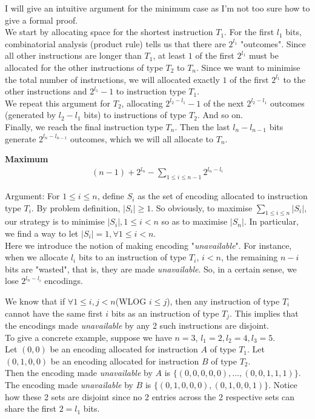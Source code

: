 \documentclass{article}
\begin{document}
I will give an intuitive argument for the minimum case as I'm not too sure how to give a formal proof.\\
We start by allocating space for the shortest instruction $T_1$. For the first $l_1$ bits, combinatorial analysis (product rule) tells us that there are $2^{l_1}$ "outcomes". Since all other instructions are longer than $T_1$, at least $1$ of the first $2^{l_1}$ must be allocated for the other instructions of type $T_2$ to $T_n$. Since we want to minimise the total number of instructions, we will allocated exactly $1$ of the first $2^{l_1}$ to the other instructions and $2^{l_1}-1$ to instruction type $T_1$.\\
We repeat this argument for $T_2$, allocating $2^{l_2-l_1}-1$ of the next $2^{l_2-l_1}$ outcomes (generated by $l_2-l_1$ bits) to instructions of type $T_2$. And so on.\\
Finally, we reach the final instruction type $T_n$. Then the last $l_n-l_{n-1}$ bits generate  $2^{l_n-l_{n-1}}$ outcomes, which we will all allocate to $T_n$.

\textbf{Maximum}
\begin{align*}
	(n-1) + 2^{l_n} - \sum_{1\leq i\leq n-1}2^{l_n-l_i}
\end{align*}

Argument: For $1\leq i\leq n$, define $S_i$ as the set of encoding allocated to instruction type $T_i$. By problem definition, $|S_i|\geq 1$. So obviously, to maximise $\sum_{1\leq i\leq n} |S_i|$, our strategy is to minimise $|S_i|, 1\leq i<n$ so as to maximise $|S_n|$. In particular, we find a way to let $|S_i|=1, \forall 1\leq i<n$.\\
Here we introduce the notion of making encoding "\textit{unavailable}". For instance, when we allocate $l_i$ bits to an instruction of type $T_i$, $i<n$, the remaining $n-i$ bits are "wasted", that is, they are made \textit{unavailable}. So, in a certain sense, we lose $2^{l_n-l_i}$ encodings.

We know that if $\forall 1\leq i,j<n$(WLOG $i\leq j$), then any instruction of type $T_i$ cannot have the same first $i$ bits as an instruction of type $T_j$. This implies that the encodings made \textit{unavailable} by any 2 such instructions are disjoint.\\
To give a concrete example, suppose we have $n=3$, $l_1=2,l_2=4,l_3=5$. \\
Let $(0,0)$ be an encoding allocated for instruction $A$ of type $T_1$. Let $(0,1,0,0)$ be an encoding allocated for instruction $B$ of type $T_2$.\\
Then the encoding made \textit{unavailable} by $A$ is $\{(0,0,0,0,0),\dots, (0,0,1,1,1)\}$. The encoding made \textit{unavailable} by $B$ is $\{(0,1,0,0,0),(0,1,0,0,1)\}$. Notice how these 2 sets are disjoint since no 2 entries across the 2 respective sets can share the first $2=l_1$ bits.
\end{document}
